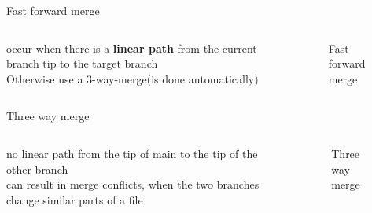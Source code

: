 \documentclass{beamer}
\begin{document}
\begin{frame}[fragile,t]{Fast forward merge}\vspace{10pt}
  \begin{columns}
    \begin{column}{0.5\textwidth}
      occur when there is a \textbf{linear path} from the current branch tip to the target branch\vspace{10pt}\\
      Otherwise use a 3-way-merge(is done automatically)
    \end{column}

    \begin{column}{0.5\textwidth}
      \begin{figure}
        \vspace{-15pt}
        \centering
        
        \caption{Fast forward merge}
      \end{figure}
    \end{column}
  \end{columns}
\end{frame}


\begin{frame}[fragile,t]{Three way merge}\vspace{10pt}
  \begin{columns}
    \begin{column}{0.5\textwidth}
      no linear path from the tip of main to the tip of the other branch\vspace{10pt}\\
      can result in merge conflicts, when the two branches change similar parts of a file
    \end{column}

    \begin{column}{0.5\textwidth}
      \begin{figure}
        \vspace{-15pt}
        \centering
        
        \caption{Three way merge}
      \end{figure}
    \end{column}
  \end{columns}
\end{frame}
\end{document}
